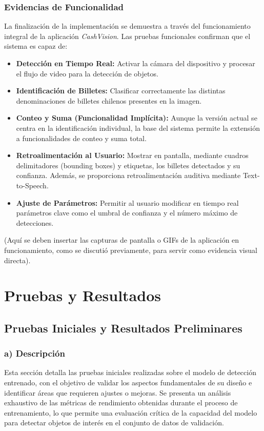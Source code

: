 \documentclass[10pt,a4paper]{report}
\begin{document}
\subsection{Evidencias de Funcionalidad}
La finalización de la implementación se demuestra a través del funcionamiento integral de la aplicación \textit{CashVision}. Las pruebas funcionales confirman que el sistema es capaz de:
\begin{itemize}
    \item \textbf{Detección en Tiempo Real:} Activar la cámara del dispositivo y procesar el flujo de video para la detección de objetos.
    \item \textbf{Identificación de Billetes:} Clasificar correctamente las distintas denominaciones de billetes chilenos presentes en la imagen.
    \item \textbf{Conteo y Suma (Funcionalidad Implícita):} Aunque la versión actual se centra en la identificación individual, la base del sistema permite la extensión a funcionalidades de conteo y suma total.
    \item \textbf{Retroalimentación al Usuario:} Mostrar en pantalla, mediante cuadros delimitadores (bounding boxes) y etiquetas, los billetes detectados y su confianza. Además, se proporciona retroalimentación auditiva mediante Text-to-Speech.
    \item \textbf{Ajuste de Parámetros:} Permitir al usuario modificar en tiempo real parámetros clave como el umbral de confianza y el número máximo de detecciones.
\end{itemize}

(Aquí se deben insertar las capturas de pantalla o GIFs de la aplicación en funcionamiento, como se discutió previamente, para servir como evidencia visual directa).

\chapter{Pruebas y Resultados}
\section{Pruebas Iniciales y Resultados Preliminares}

\subsection{a) Descripción}

Esta sección detalla las pruebas iniciales realizadas sobre el modelo de detección entrenado, con el objetivo de validar los aspectos fundamentales de su diseño e identificar áreas que requieren ajustes o mejoras. Se presenta un análisis exhaustivo de las métricas de rendimiento obtenidas durante el proceso de entrenamiento, lo que permite una evaluación crítica de la capacidad del modelo para detectar objetos de interés en el conjunto de datos de validación.
\end{document}
